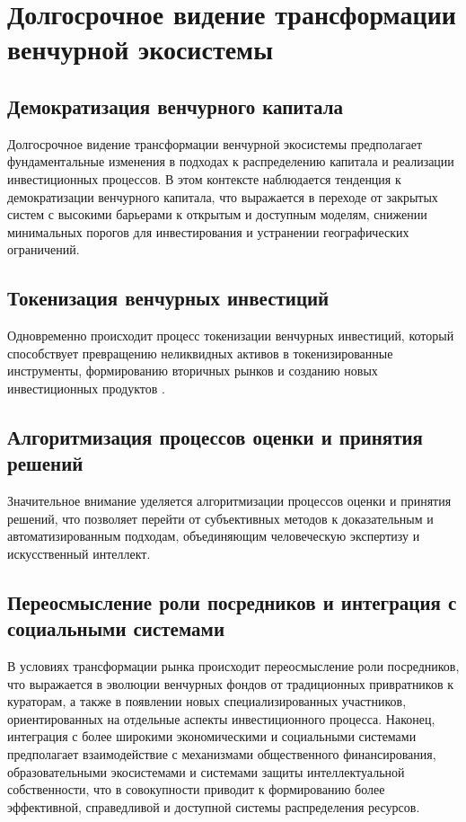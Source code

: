 \documentclass[
    candidate, %
    subf, %
    dotsinheaders=false,
]{disser}
\begin{document}
\section{Долгосрочное видение трансформации венчурной экосистемы}

\subsection{Демократизация венчурного капитала}
Долгосрочное видение трансформации венчурной экосистемы предполагает фундаментальные изменения в подходах к распределению капитала и реализации инвестиционных процессов. В этом контексте наблюдается тенденция к демократизации венчурного капитала, что выражается в переходе от закрытых систем с высокими барьерами к открытым и доступным моделям, снижении минимальных порогов для инвестирования и устранении географических ограничений.

\subsection{Токенизация венчурных инвестиций}
Одновременно происходит процесс токенизации венчурных инвестиций, который способствует превращению неликвидных активов в токенизированные инструменты, формированию вторичных рынков и созданию новых инвестиционных продуктов \cite{goldstein2019fintech}.

\subsection{Алгоритмизация процессов оценки и принятия решений}
Значительное внимание уделяется алгоритмизации процессов оценки и принятия решений, что позволяет перейти от субъективных методов к доказательным и автоматизированным подходам, объединяющим человеческую экспертизу и искусственный интеллект.

\subsection{Переосмысление роли посредников и интеграция с социальными системами}
В условиях трансформации рынка происходит переосмысление роли посредников, что выражается в эволюции венчурных фондов от традиционных привратников к кураторам, а также в появлении новых специализированных участников, ориентированных на отдельные аспекты инвестиционного процесса. Наконец, интеграция с более широкими экономическими и социальными системами предполагает взаимодействие с механизмами общественного финансирования, образовательными экосистемами и системами защиты интеллектуальной собственности, что в совокупности приводит к формированию более эффективной, справедливой и доступной системы распределения ресурсов.
\end{document}
